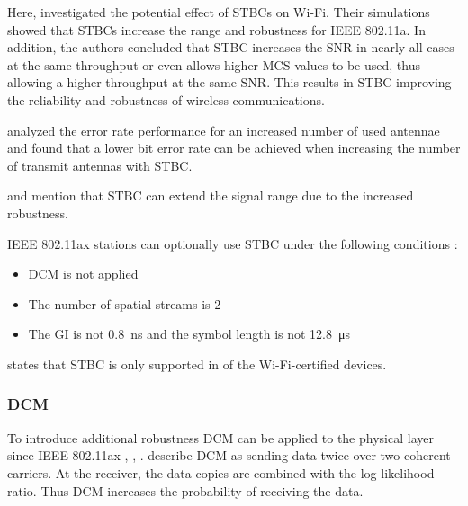 Here, \textcite{stamoulis_impact_2003} investigated the potential effect of \acp{STBC} on Wi-Fi.
Their simulations showed that \acp{STBC} increase the range and robustness for IEEE 802.11a.
In addition, the authors concluded that \ac{STBC} increases the \ac{SNR} in nearly all cases at the same throughput or
even allows higher \ac{MCS} values to be used,
thus allowing a higher throughput at the same \ac{SNR}.
This results in \ac{STBC} improving the reliability and robustness of wireless communications.

\textcite{ghosh_error_2014} analyzed the error rate performance for an increased number of used antennae and found
that a lower bit error rate can be achieved
when increasing the number of transmit antennas with \ac{STBC}.

\textcite[Chapter~4]{gast_80211n_2012} and \textcite[301]{sauter_wireless_2022} mention that \ac{STBC} can extend the signal range
due to the increased robustness.


IEEE 802.11ax stations can optionally use \ac{STBC} under the following conditions \cite{ieee_standard_2021ax}:
\begin{itemize}
	\item \ac{DCM} is not applied
	\item The number of spatial streams is \num{2}
	\item The \ac{GI} is not \SI{0.8}{\nano\second} and the symbol length is not \SI{12.8}{\micro\second}
\end{itemize}

\textcite[Chapter~8]{gast_80211n_2012} states that \ac{STBC} is only supported in  of the Wi-Fi-certified devices.


\subsubsection*{\acf{DCM}}
To introduce additional robustness \ac{DCM} can be applied to the physical layer since
IEEE 802.11ax \cite{jacob_system-level_2020}, \cite{triwinarko_phy_2021}, \cite{ieee_standard_2021ax}.
\textcite{jacob_system-level_2020} describe \ac{DCM} as sending data twice over two coherent carriers.
At the receiver, the data copies are combined with the log-likelihood ratio.
Thus \ac{DCM} increases the probability of receiving the data.

